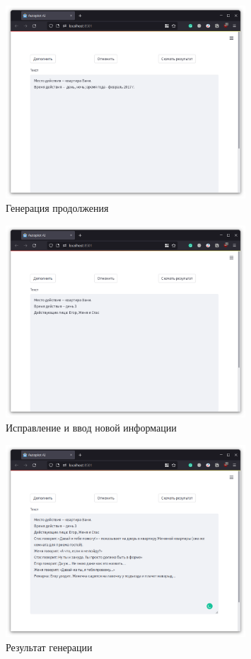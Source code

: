 \begin{figure}
    \centering
    \includegraphics[width=0.8\textwidth]{../inc/images/demo-3.png}
    \caption{Генерация продолжения}
    \label{fig:demo-3}
\end{figure}
\begin{figure}
    \centering
    \includegraphics[width=0.8\textwidth]{../inc/images/demo-4.png}
    \caption{Исправление и ввод новой информации}
    \label{fig:demo-4}
\end{figure}
\begin{figure}
    \centering
    \includegraphics[width=0.8\textwidth]{../inc/images/demo-5.png}
    \caption{Результат генерации}
    \label{fig:demo-5}
\end{figure}

